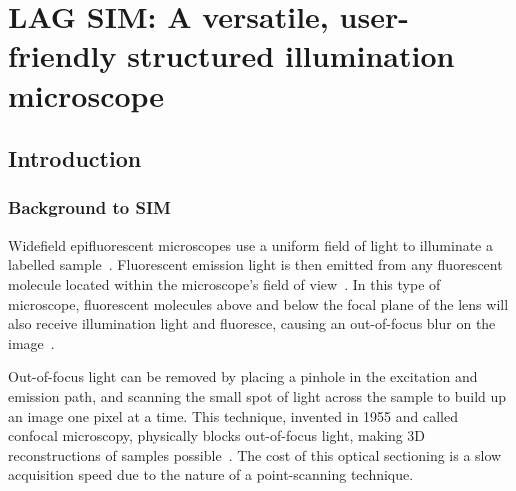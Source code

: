 \chapter{LAG SIM: A versatile, user-friendly structured illumination microscope} \label{chap:LAGSIM}



\ifpdf
    \graphicspath{{Chapter2/Figs/Raster/}{Chapter2/Figs/PDF/}{Chapter2/Figs/}}
\else
    \graphicspath{{Chapter2/Figs/Vector/}{Chapter2/Figs/}}
\fi

%

\section{Introduction} \label{sec:simintro}
\subsection{Background to SIM} \label{sec:sim-background}
Widefield epifluorescent microscopes use a uniform field of light to illuminate a labelled sample~\cite[\textit{ch. 2}]{lakowicz2007principles}. 
Fluorescent emission light is then emitted from any fluorescent molecule located within the microscope's field of view~\cite{pawley2012handbook}. 
In this type of microscope, fluorescent molecules above and below the focal plane of the lens will also receive illumination light and fluoresce, causing an out-of-focus blur on the image~\cite{wilson1984theory}.

Out-of-focus light can be removed by placing a pinhole in the excitation and emission path, and scanning the small spot of light across the sample to build up an image one pixel at a time. 
This technique, invented in 1955 and called confocal microscopy, physically blocks out-of-focus light, making 3D reconstructions of samples possible~\cite{marvin1961microscopy}. 
The cost of this optical sectioning is a slow acquisition speed due to the nature of a point-scanning technique. 

